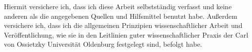 \thispagestyle{empty}
Hiermit versichere ich, dass ich diese Arbeit selbstständig verfasst und
keine anderen als die angegebenen Quellen und Hilfsmittel benutzt habe.
Außerdem versichere ich, dass ich die allgemeinen Prinzipien
wissenschaftlicher Arbeit und Veröffentlichung, wie sie in den
Leitlinien guter wissenschaftlicher Praxis der Carl von Ossietzky
Universität Oldenburg festgelegt sind, befolgt habe.
